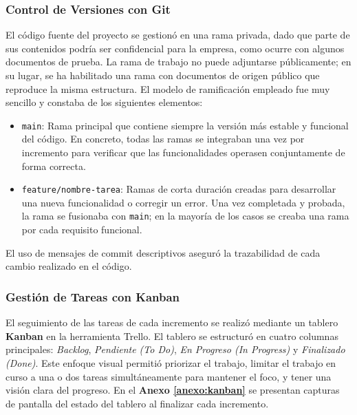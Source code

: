 \subsubsection{Control de Versiones con Git}
El código fuente del proyecto se gestionó en una rama privada, dado que parte de sus contenidos podría ser confidencial para la empresa, como ocurre con algunos documentos de prueba. La rama de trabajo no puede adjuntarse públicamente; en su lugar, se ha habilitado una rama con documentos de origen público que reproduce la misma estructura. El modelo de ramificación empleado fue muy sencillo y constaba de los siguientes elementos:
\begin{itemize}
    \item \texttt{main}: Rama principal que contiene siempre la versión más estable y funcional del código. En concreto, todas las ramas se integraban una vez por incremento para verificar que las funcionalidades operasen conjuntamente de forma correcta.
    \item \texttt{feature/nombre-tarea}: Ramas de corta duración creadas para desarrollar una nueva funcionalidad o corregir un error. Una vez completada y probada, la rama se fusionaba con \texttt{main}; en la mayoría de los casos se creaba una rama por cada requisito funcional.
\end{itemize}
El uso de mensajes de commit descriptivos aseguró la trazabilidad de cada cambio realizado en el código.

\subsubsection{Gestión de Tareas con Kanban}
El seguimiento de las tareas de cada incremento se realizó mediante un tablero \textbf{Kanban} en la herramienta Trello. El tablero se estructuró en cuatro columnas principales: \textit{Backlog}, \textit{Pendiente (To Do)}, \textit{En Progreso (In Progress)} y \textit{Finalizado (Done)}. Este enfoque visual permitió priorizar el trabajo, limitar el trabajo en curso a una o dos tareas simultáneamente para mantener el foco, y tener una visión clara del progreso. En el \textbf{Anexo \ref{anexo:kanban}} se presentan capturas de pantalla del estado del tablero al finalizar cada incremento.

